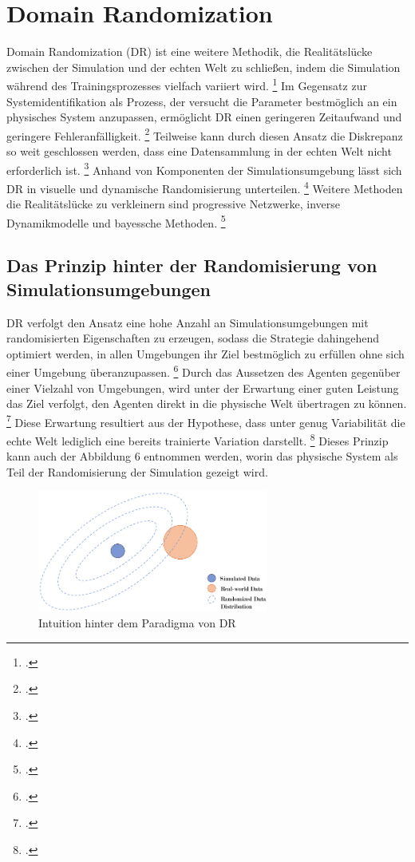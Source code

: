 \section{Domain Randomization}

Domain Randomization (DR) ist eine weitere Methodik, die Realitätslücke zwischen der Simulation und der echten Welt zu schließen, indem die Simulation während des Trainingsprozesses vielfach variiert wird. \footcite[Vgl.][S. 3]{Bharadhwaj.2019}
Im Gegensatz zur Systemidentifikation als Prozess, der versucht die Parameter bestmöglich an ein physisches System anzupassen, ermöglicht DR einen geringeren Zeitaufwand und geringere Fehleranfälligkeit. \footcite[Vgl.][S. 1]{Tobin.2017}
Teilweise kann durch diesen Ansatz die Diskrepanz so weit geschlossen werden, dass eine Datensammlung in der echten Welt nicht erforderlich ist. \footcite[Vgl.][S. 2]{Molchanov.2019}
Anhand von Komponenten der Simulationsumgebung lässt sich DR in visuelle und dynamische Randomisierung unterteilen. \footcite[Vgl.][S. 5]{Zhao.2020}
Weitere Methoden die Realitätslücke zu verkleinern sind progressive Netzwerke, inverse Dynamikmodelle und bayessche Methoden. \footcite[Vgl.][S. 2]{Chen.2021}

\subsection{Das Prinzip hinter der Randomisierung von Simulationsumgebungen}

DR verfolgt den Ansatz eine hohe Anzahl an Simulationsumgebungen mit randomisierten Eigenschaften zu erzeugen, sodass die Strategie dahingehend optimiert werden, in allen Umgebungen ihr Ziel bestmöglich zu erfüllen ohne sich einer Umgebung überanzupassen. \footcite[Vgl.][S. 1]{Hsu.2023}
Durch das Aussetzen des Agenten gegenüber einer Vielzahl von Umgebungen, wird unter der Erwartung einer guten Leistung das Ziel verfolgt, den Agenten direkt in die physische Welt übertragen zu können. \footcite[Vgl.][S. 2]{Chen.2021}
Diese Erwartung resultiert aus der Hypothese, dass unter genug Variabilität die echte Welt lediglich eine bereits trainierte Variation darstellt. \footcite[Vgl.][S. 1]{Tobin.2017}
Dieses Prinzip kann auch der Abbildung 6 entnommen werden, worin das physische System als Teil der Randomisierung der Simulation gezeigt wird. 

\begin{figure}[htb]
    \centering
    \includegraphics[height=4cm]{lib/graphics/Domain_randomization.png}
    \caption[Intuition hinter dem Paradigma von DR]{Intuition hinter dem Paradigma von DR\footnotemark}
    \label{abb:Domain_randomization}
\end{figure}

